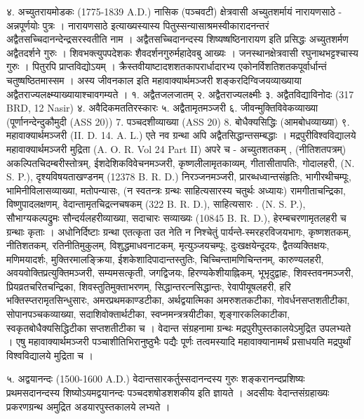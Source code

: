 ४. अच्युतरायमोडकः (1775-1839 A.D.)
नासिक (पञ्चवटी) क्षेत्रवासी अच्युतशर्मायं नारायणसाठे - अन्नपूर्णयोः पुत्रः । नारायणसाठे इत्याख्यस्यास्य पितुस्सन्यासाश्रमस्वीकारादनन्तरं अद्वैतसच्चिदानन्देन्द्रसरस्वतीति नाम । अद्वैतसच्चिदानन्दस्य शिष्यष्षष्ठिनारायण इति प्रसिद्धः अच्युतशर्मण अद्वैतदर्शने गुरुः । शिवभक्त्युपपदेशकः शैवदर्शनगुरुर्महादेवबु आख्यः । जनस्थानक्षेत्रवासी रघुनाथभट्टश्चास्य गुरुः । पितुरपि प्राप्तविद्योऽयम् । क्रैस्तवीयाष्टादशशतकापरार्धादारभ्य एकोनर्विशतिशतकपूर्वार्धान्तं चतुष्षष्ठितमास्सम । अस्य जीवनकाल इति महावाक्यार्थमञ्जरी शङ्करदिग्विजयव्याख्याया अद्वैतराज्यलक्ष्म्याख्यायाश्चावगम्यते ।
१. अद्वैतजलजातम् २. अद्वैतराज्यलक्ष्मीः ३. अद्वैतविद्याविनोदः (317 BRD, 12 Nasir)  ४. अवैदिकमततिरस्कारः ५. अद्वैतामृतमञ्जरी ६. जीवन्मुक्तिविवेकव्याख्या (पूर्णानन्देन्दुकौमुदी (ASS 20)) 7. पञ्चदशीव्याख्या (ASS 20) 8. बोधैक्यसिद्धिः (आमबोधव्याख्या) ९. महावाक्यार्थमञ्जरी (II. D. 14. A. L.) एते नव ग्रन्था अपि अद्वैतसिद्धान्तसम्बद्धाः । मद्रपुरीविश्वविद्यालये महावाक्यार्थमञ्जरी मुद्रिता (A. O. R. Vol 24 Part II)
अपरे च - अच्युतशतकम् , (नीतिशतपत्रम्) अकल्पितचिदम्बरीस्तोत्रम्, ईशदेशिकविवेचनमञ्जरी, कृष्णलीलामृतकाव्यम्, गीतासीतापतिः, गोदालहरी, (N. S. P.), दृश्यविषयताखण्डनम् (12378 B. R. D.) निरञ्जनमञ्जरी, प्रारब्धध्वान्तसंहृतिः, भागीरथीचम्पूः, भामिनीविलासव्याख्या, मतोपन्यासः, (न स्वतन्त्रः ग्रन्थः साहित्यसारस्य चतुर्थः अध्यायः) रामगीताचन्द्रिका, विष्णुपादलक्षणम्, वेदान्तामृतचिद्रत्नचषकम् (322 B. R. D.), साहित्यसारः . (N. S. P.), सौभाग्यकल्पद्रुमः सौन्दर्यलहरीव्याख्या, सदाचारः सव्याख्यः (10845 B. R. D.), हेरम्बचरणामृतलहरी च ग्रन्थाः कृताः । अधोनिर्दिष्टाः ग्रन्था एतत्कृता उत नेति न निश्चेतुं पार्यन्ते-स्मरहरविजयभागः, कृष्णशतकम्, नीतिशतकम्, रतिनीतिमुकुलम्, विशुद्धमाधवनाटकम्, मृत्युञ्जयचम्पूः, दुःखक्षयेन्दूदयः, द्वैतव्यक्तिक्षयः, मणिमयादर्शः, मुक्तिरमालङ्क्रिया, ईशकेशादिपादान्तस्तुतिः, चिच्चिन्तामणिचिन्तनम्, कारुण्यलहरी, अवयवोक्तिप्रत्युक्तिमञ्जरी, सम्यमसत्कृती, जगद्विजयः, हिरण्यकेशीयाह्निकम्, भूभृदुद्वाहः, शिवस्तवनमञ्जरी, प्रियव्रतचरितचन्द्रिका, शिवस्तुतिमुक्ताभरणम्, सिद्धान्तरत्नसिद्धान्तः, रेवापीयूषलहरी, हरि भक्तिस्प्तरामृतसिन्धुसारः, अमरप्रथमकाण्डटीका, अर्थद्वयात्मिका अमरुशतकटीका, गोवर्धनसप्तशतीटीका, सोपानपञ्चकव्याख्या, सदाशिवोक्तार्थटीका, स्वप्नमन्त्रत्रयीटीका, शृङ्गारकलिकाटीका, स्वकृतबोधैक्यसिद्धिटीका सप्तशतीटीका च । वेदान्त संग्रहनामा ग्रन्थः मद्रपुरीपुस्तकालयेऽमुद्रित उपलभ्यते ।
एषु महावाक्यार्थमञ्जरी पञ्चाशीतिभिरानुष्ठुभैः पद्यैः पूर्णः तत्वमस्यादि महावाक्यानामर्थं प्रसाधयति मद्रपुर्थां विश्वविद्यालये मुद्रिता च ।

५. अद्वयानन्दः (1500-1600 A.D.)
वेदान्तसारकर्तुस्सदानन्दस्य गुरुः शङ्करानन्दप्रशिष्यः प्रथमसदानन्दस्य शिष्योऽयमद्वयानन्दः पञ्चदशषोडशशकीय इति ज्ञायते । अदसीयः वेदान्तसंग्रहाख्यः प्रकरणग्रन्थ अमुद्रित अडयारपुस्तकालये लभ्यते ।

